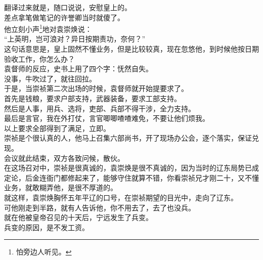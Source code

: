 \begin{multicols}{\theparacolNo}
翻译过来就是，随口说说，安慰皇上的。\\

差点拿笔做笔记的许誉卿当时就傻了。\\

他立刻小声\footnote{怕旁边人听见。}地对袁崇焕说：\\

“上英明，岂可浪对？异日按期责功，奈何？”\\

这句话意思是，皇上固然不懂业务，但是比较较真，现在忽悠他，到时候他按日期验收工作，你怎么办？\\

袁督师的反应，史书上用了四个字：怃然自失。\\

没事，牛吹过了，就往回拉。\\

于是，当崇祯第二次出场的时候，袁督师就开始提要求了。\\

首先是钱粮，要求户部支持，武器装备，要求工部支持。\\

然后是人事，用兵、选将，吏部、兵部不得干涉，全力支持。\\

最后是言官，我在外打仗，言官唧唧喳喳难免，不要让他们烦我。\\

以上要求全部得到了满足，立即。\\

崇祯是个很认真的人，他马上召集六部尚书，开了现场办公会，逐个落实，保证兑现。\\

会议就此结束，双方各致问候，散伙。\\

在这场召对中，崇祯是很真诚的，袁崇焕是很不真诚的，因为当时的辽东局势已成定论，后金连衙门都修起来了，能够守住就算不错，你看崇祯兄才刚二十，又不懂业务，就敢糊弄他，是很不厚道的。\\

就这样，袁崇焕胸怀五年平辽的口号，在崇祯期望的目光中，走向了辽东。\\

可他刚走到半路，就有人告诉他，你不用去了，去了也没兵。\\

就在他被皇帝召见的十天后，宁远发生了兵变。\\

兵变的原因，是不发工资。\\


\end{multicols}
